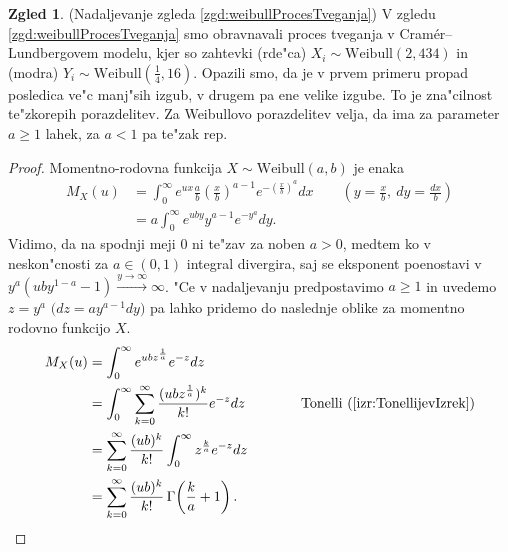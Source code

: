 \documentclass[12pt, a4paper, reqno]{amsart}
\theoremstyle{definition}
\newtheorem{zgled}[definicija]{Zgled}
\theoremstyle{plain}
\newcommand{\1}{\mathds{1}}
\begin{document}
        \begin{zgled}(Nadaljevanje zgleda \ref{zgd:weibullProcesTveganja})
            V zgledu \ref{zgd:weibullProcesTveganja} smo obravnavali proces tveganja v Cramér--Lundbergovem 
            modelu, kjer so zahtevki (rde"ca) $X_i\sim\text{Weibull}(2, 434)$ in (modra) 
            $Y_i\sim\text{Weibull}(\tfrac{1}{4}, 16)$. Opazili smo, da je v prvem primeru propad
            posledica ve"c manj"sih izgub, v drugem pa ene velike izgube. To je zna"cilnost te"zkorepih
            porazdelitev. Za Weibullovo porazdelitev velja, da ima za parameter
            $a \geq 1$ lahek, za $a<1$ pa te"zak rep.
            \begin{proof}
                Momentno-rodovna funkcija $X\sim\text{Weibull}(a, b)$ je enaka
                \begin{align*}
                    M_X(u) &= \int_{0}^{\infty}e^{ux}\frac{a}{b}\left(\frac{x}{b}\right)^{a-1}e^{-\left(\frac{x}{b}\right)^a}dx \qquad \left(y = \tfrac{x}{b},\ dy = \tfrac{dx}{b}\right) \\
                           &= a\int_{0}^{\infty}e^{uby} y^{a-1}e^{-y^a}dy.
                \end{align*}
                Vidimo, da na spodnji meji $0$ ni te"zav za noben $a > 0$, medtem ko v neskon"cnosti 
                za $a\in(0, 1)$ integral divergira, saj se 
                eksponent poenostavi v $y^a(uby^{1 - a} - 1)\xrightarrow{y\to\infty}\infty$. "Ce v 
                nadaljevanju predpostavimo $a\geq 1$ in uvedemo $z = y^a$ 
                $\bigl(dz = ay^{a-1}dy\bigr)$ pa lahko pridemo do naslednje oblike 
                za momentno rodovno funkcijo $X$. \phantom{\qedhere}
                \pagebreak
                \begin{align*}
                    M_X(u) &= \int_{0}^{\infty}e^{ubz^{\frac{1}{a}}}e^{-z}dz \\
                           &= \int_{0}^{\infty}\sum_{k=0}^{\infty}\frac{(ubz^{\frac{1}{a}})^k}{k!}e^{-z}dz \qquad \qquad \text{Tonelli} \ (\ref{izr:TonellijevIzrek}) \\
                           &= \sum_{k=0}^{\infty}\frac{(ub)^k}{k!}\int_{0}^{\infty}z^{\frac{k}{a}}e^{-z}dz \\
                           &= \sum_{k=0}^{\infty}\frac{(ub)^k}{k!} \, \Gamma \! \left(\frac{k}{a} + 1\right).
                \end{align*} 
            \end{proof}
            \label{zgd:weibullLahkorepnaPorazdelitev}
        \end{zgled}
    
\end{document}
